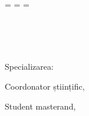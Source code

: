 \begin{titlepage}
  \oddsidemargin=\evensidemargin\relax
  \textwidth=\dimexpr{}\evensidemargin-2in\relax
  \hsize=\textwidth\relax

  \centering

  \begin{flushright}
  {%
    \vspace*{10mm}
  }
  \end{flushright}

  \vspace{5mm}
  {\LARGE{\getUniversity{}}}\\
  
  \vspace{5mm}
  {\LARGE{\getFaculty{}}}\\
  
  \vspace{5mm}
  {\LARGE{\getDepartment{}}}\\
  
  \vspace{5mm}
  \begin{flushleft}
  {\large Specializarea:}
  {\large{\getSpecialty{}}}\\
  \end{flushleft}
  
  \vfill
  {\huge\bfseries \getDoctype}

  \vspace{5mm}
  {\huge\bfseries \getTitle{}}

  \vfill
  \begin{flushleft}
  {\large Coordonator științific,}\\
  {\large \getAdvisor{}}
  \end{flushleft}

  \vspace{5mm}
  \begin{flushright}
  {\large Student masterand,}\\
  {\large \getAuthor{}}
  \end{flushright}


  \vfill
  {\huge{\getSubmissionLocation{}}}\\
  
  \vspace{5mm}
  {\huge{\getSubmissionDate}{}}\\

\end{titlepage}
